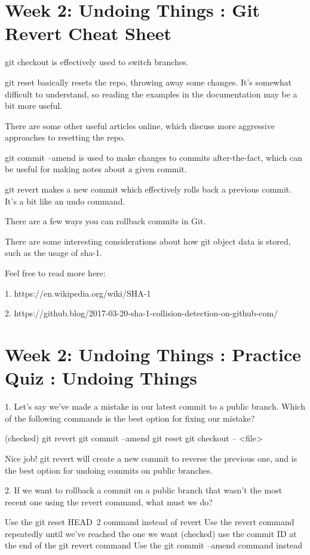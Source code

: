 \documentclass[11pt, onecolumn]{article}
\begin{document}
\section{Week 2: Undoing Things : Git Revert Cheat Sheet}
git checkout is effectively used to switch branches.

git reset basically resets the repo, throwing away some changes. It’s somewhat difficult to understand, so reading the examples in the documentation may be a bit more useful.

There are some other useful articles online, which discuss more aggressive approaches to resetting the repo.

git commit --amend is used to make changes to commits after-the-fact, which can be useful for making notes about a given commit.

git revert makes a new commit which effectively rolls back a previous commit. It’s a bit like an undo command.

There are a few ways you can rollback commits in Git.

There are some interesting considerations about how git object data is stored, such as the usage of sha-1. 

Feel free to read more here:

1. https://en.wikipedia.org/wiki/SHA-1

2. https://github.blog/2017-03-20-sha-1-collision-detection-on-github-com/



\section{Week 2: Undoing Things : Practice Quiz : Undoing Things}

1. Let's say we've made a mistake in our latest commit to a public branch. Which of the following commands is the best option for fixing our mistake?

(checked) git revert
git commit --amend
git reset
git checkout -- <file>

Nice job! git revert will create a new commit to reverse the previous one, and is the best option for undoing commits on public branches.


2. If we want to rollback a commit on a public branch that wasn't the most recent one using the revert command, what must we do?

Use the git reset HEAD~2 command instead of revert
Use the revert command repeatedly until we've reached the one we want
(checked) use the commit ID at the end of the git revert command
Use the git commit --amend command instead
\end{document}
